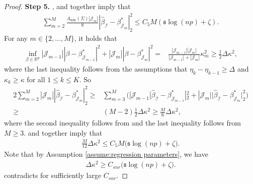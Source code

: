 \documentclass[11pt]{article}
\newcommand{\I}{{\mathcal I }}
\newcommand{\J}{{  \mathcal J } }
\newcommand{\s}{ { \mathfrak{s}  } }
\theoremstyle{plain}
\theoremstyle{definition}
\begin{document}
\begin{proof}
{\bf Step 5.} 
,  and  together imply  that 
\begin{align} \label{eq:regression three change points step six} \sum_{ m  =2}^M \frac{\Lambda_{\min} (\Sigma) |\J_m   | }{8}  |\widehat \beta _\I  -  \beta^* _{\J_ m  }  |_2^2      \le C_5 M (\s \log(np)   + \zeta) .
\end{align} 
 For any $  m \in\{2, \ldots, M\}$, it holds that
\begin{align}  \label{eq:regression three change points signal lower bound} \inf_{  \beta  \in \mathbb R^p   }  |\J_{m-1} |   |   \beta - \beta^* _{\J_ {m-1}   }   |  ^2 + |\J_{m} |  |   \beta - \beta^* _{\J_ m  }  |  ^2   =&     \frac{|\J_{m-1}| |\J_m|}{ |\J_{m-1}| +  |\J_m| } \kappa_m ^2  \ge \frac{1}{2} \Delta \kappa^2,
\end{align}  
where the last inequality follows from the assumptions that $\eta_k - \eta_{k-1}\ge \Delta  $ and $ \kappa_k \ge \kappa$  for all $1\le k \le K$. So
\begin{align}    \nonumber  2 \sum_{ m=2}^{M   }   |\J_m | |\widehat \beta _\I  -  \beta^* _{\J_ m  }  |_2^2   
\ge    &   \sum_{m=3}^{M}   \bigg(  |\J_{m-1}   |\widehat \beta _\I  -  \beta^* _{\J_ {m-1}   }  |_2^2      + |\J_m | |\widehat \beta _\I  -  \beta^* _{\J_ m  }  |_2^2    \bigg) 
\\
 \label{eq:regression three change points signal lower bound two} 
 \ge&   (M-2)  \frac{ 1}{2} \Delta \kappa^2  \ge \frac{M}{6} \Delta \kappa^2 ,
\end{align} 
where the second inequality follows from   and the last inequality follows from $M\ge 3$.  and   together imply that 
\begin{align}\label{eq:regression three change points signal lower bound three} 
 \frac{M}{12} \Delta \kappa^2 \le    C_5  M\big(  \s   \log(np )  
+  \zeta  \big) .
\end{align}
Note that by Assumption \ref{assume:regression parameters}, we have 
\begin{align} \label{eq:regression three change points snr}
\Delta \kappa^2 \ge C _{snr}     \big( \s \log(np) +  \zeta ).
\end{align} 
 contradicts  for sufficiently large $C_{snr}$. 
 
  
 \end{proof} 
 
\end{document}
